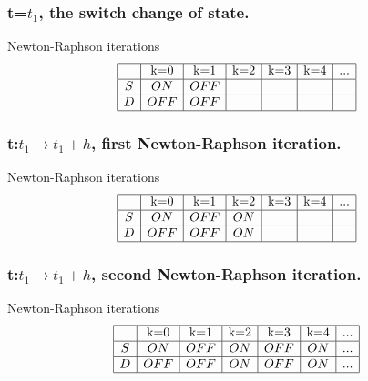 \frame
{

\frametitle{t=$t_1$, the switch change of state.}
  \begin{figure}[!h]
   \centerline{
   \scalebox{0.9}{
    
    }
 } 
 \end{figure}
  \begin{block}{Newton-Raphson iterations}
\begin{equation}
\begin{array}{|c|c|c|c|c|c|c|}
\hline
&$k=0$&$k=1$&$k=2$&$k=3$&$k=4$&...\\
\hline
S&ON&OFF&&&&\\
\hline
D&OFF&OFF&&&&\\
\hline
\end{array}
\end{equation}
\end{block}

 }
  \frame
{

\frametitle{t:$t_1 \to t_1+h$, first Newton-Raphson iteration.}
  \begin{figure}[!h]
   \centerline{
   \scalebox{0.9}{
    
    }
 } 
 \end{figure}
  \begin{block}{Newton-Raphson iterations}
\begin{equation}
\begin{array}{|c|c|c|c|c|c|c|}
\hline
&$k=0$&$k=1$&$k=2$&$k=3$&$k=4$&...\\
\hline
S&ON&OFF&ON&&&\\
\hline
D&OFF&OFF&ON&&&\\
\hline
\end{array}
\end{equation}
\end{block}


 }
  \frame
{

\frametitle{t:$t_1 \to t_1+h$, second Newton-Raphson iteration.}
  \begin{figure}[!h]
   \centerline{
   \scalebox{0.9}{
    
    }
 } 
 \end{figure}
   \begin{block}{Newton-Raphson iterations}
\begin{equation}
\begin{array}{|c|c|c|c|c|c|c|}
\hline
&$k=0$&$k=1$&$k=2$&$k=3$&$k=4$&...\\
\hline
S&ON&OFF&ON&OFF&ON&...\\
\hline
D&OFF&OFF&ON&OFF&ON&...\\
\hline
\end{array}
\end{equation}
\end{block}

 }



